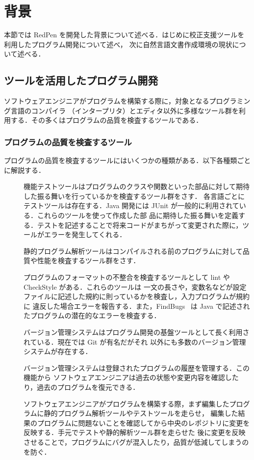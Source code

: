 \section{背景}
本節では RedPen を開発した背景について述べる．はじめに校正支援ツールを利用したプログラム開発について述べ，
次に自然言語文書作成環境の現状について述べる．

\subsection{ツールを活用したプログラム開発}
ソフトウェアエンジニアがプログラムを構築する際に，対象となるプログラミング言語のコンパイラ
（インタープリタ）とエディタ以外に多様なツール群を利用する．その多くはプログラムの品質を検査するツールである．

\subsubsection{プログラムの品質を検査するツール}
プログラムの品質を検査するツールにはいくつかの種類がある．以下各種類ごとに解説する．

\begin{description}
 \item[] 
   機能テストツールはプログラムのクラスや関数といった部品に対して期待した振る舞いを行っているかを検査するツール群をさす．
   各言語ごとにテストツールは存在する．Java 開発には JUnit が一般的に利用されている．これらのツールを使って作成した部
   品に期待した振る舞いを定義する．テストを記述することで将来コードがまちがって変更された際に，ツールがエラーを発生してくれる．
 \item[]
   静的プログラム解析ツールはコンパイルされる前のプログラムに対して品質や性能を検査するツール群をさす．
   
   プログラムのフォーマットの不整合を検査するツールとして lint や CheckStyle がある．これらのツールは
   一文の長さや，変数名などが設定ファイルに記述した規約に則っているかを検査し，入力プログラムが規約に
   違反した場合エラーを報告する．また，FindBugs~\cite{findbugs} は Java で記述されたプログラムの潜在的なエラーを検査する．
\item[]
  バージョン管理システムはプログラム開発の基盤ツールとして長く利用されている．現在では Git が有名だがそれ
  以外にも多数のバージョン管理システムが存在する．

  バージョン管理システムは登録されたプログラムの履歴を管理する．この機能から
  ソフトウェアエンジニアは過去の状態や変更内容を確認したり，過去のプログラムを復元できる．
  
  ソフトウェアエンジニアがプログラムを構築する際，まず編集したプログラムに静的プログラム解析ツールやテストツールを走らせ，
  編集した結果のプログラムに問題ないことを確認してから中央のレポジトリに変更を反映する．手元でテストや静的解析ツール群を走らせた
  後に変更を反映させることで，プログラムにバグが混入したり，品質が低減してしまうのを防ぐ．
\end{description}

